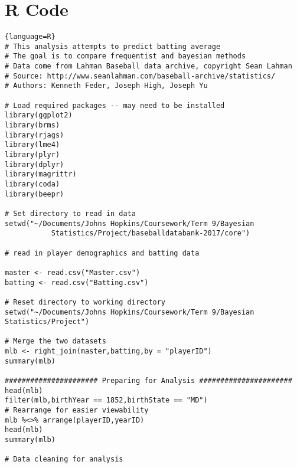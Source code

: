 \section*{R Code}
\begin{lstlisting}{language=R}
# This analysis attempts to predict batting average
# The goal is to compare frequentist and bayesian methods
# Data come from Lahman Baseball data archive, copyright Sean Lahman
# Source: http://www.seanlahman.com/baseball-archive/statistics/
# Authors: Kenneth Feder, Joseph High, Joseph Yu

# Load required packages -- may need to be installed
library(ggplot2)
library(brms)
library(rjags)
library(lme4)
library(plyr)
library(dplyr) 
library(magrittr)
library(coda)
library(beepr)

# Set directory to read in data
setwd("~/Documents/Johns Hopkins/Coursework/Term 9/Bayesian 
           Statistics/Project/baseballdatabank-2017/core") 

# read in player demographics and batting data

master <- read.csv("Master.csv")
batting <- read.csv("Batting.csv")

# Reset directory to working directory
setwd("~/Documents/Johns Hopkins/Coursework/Term 9/Bayesian 
Statistics/Project")

# Merge the two datasets
mlb <- right_join(master,batting,by = "playerID")
summary(mlb)

###################### Preparing for Analysis ######################
head(mlb)
filter(mlb,birthYear == 1852,birthState == "MD")
# Rearrange for easier viewability
mlb %<>% arrange(playerID,yearID)
head(mlb)
summary(mlb)

# Data cleaning for analysis


\end{lstlisting}
